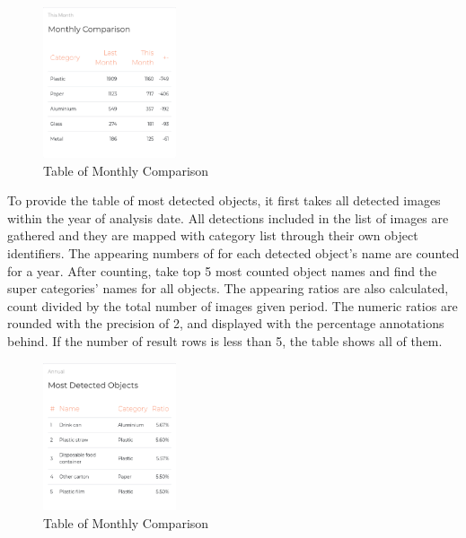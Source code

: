 \documentclass[conference]{IEEEtran}
\begin{document}
\begin{figure}[h]
    \centering
    \includegraphics[width=0.35\textwidth]{images/dashboard_comp_table.eps}
    \caption{Table of Monthly Comparison}
\end{figure}

To provide the table of most detected objects, it first takes all detected images within the year of analysis date. All detections included in the list of images are gathered and they are mapped with category list through their own object identifiers. The appearing numbers of for each detected object's name are counted for a year. After counting, take top 5 most counted object names and find the super categories' names for all objects. The appearing ratios are also calculated, count divided by the total number of images given period. The numeric ratios are rounded with the precision of 2, and displayed with the percentage annotations behind. If the number of result rows is less than 5, the table shows all of them.\\

\begin{figure}[h]
    \centering
    \includegraphics[width=0.35\textwidth]{images/dashboard_ann_table.eps}
    \caption{Table of Monthly Comparison}
\end{figure}
\end{document}
